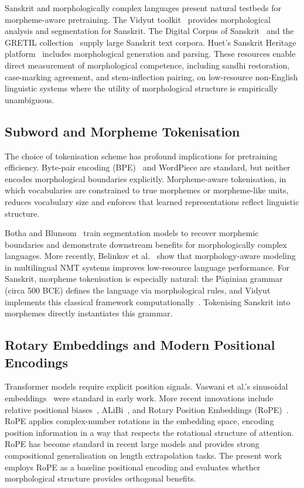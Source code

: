 Sanskrit and morphologically complex languages present natural testbeds for morpheme-aware pretraining. The Vidyut toolkit~\cite{Prasad2024Vidyut} provides morphological analysis and segmentation for Sanskrit. The Digital Corpus of Sanskrit~\cite{Goyal2012DCS} and the GRETIL collection~\cite{Germann1994GRETIL} supply large Sanskrit text corpora. Huet's Sanskrit Heritage platform~\cite{Huet2003SanskritHeritage} includes morphological generation and parsing. These resources enable direct measurement of morphological competence, including sandhi restoration, case-marking agreement, and stem-inflection pairing, on low-resource non-English linguistic systems where the utility of morphological structure is empirically unambiguous.

\subsection{Subword and Morpheme Tokenisation}

The choice of tokenisation scheme has profound implications for pretraining efficiency. Byte-pair encoding (BPE)~\cite{Sennrich2016BPE} and WordPiece are standard, but neither encodes morphological boundaries explicitly. Morpheme-aware tokenisation, in which vocabularies are constrained to true morphemes or morpheme-like units, reduces vocabulary size and enforces that learned representations reflect linguistic structure.

Botha and Blunsom~\cite{Botha2014Morphology} train segmentation models to recover morphemic boundaries and demonstrate downstream benefits for morphologically complex languages. More recently, Belinkov et al.~\cite{Belinkov2017Morphology} show that morphology-aware modeling in multilingual NMT systems improves low-resource language performance. For Sanskrit, morpheme tokenisation is especially natural: the Pāṇinian grammar (circa 500 BCE) defines the language via morphological rules, and Vidyut implements this classical framework computationally~\cite{Prasad2024Vidyut}. Tokenising Sanskrit into morphemes directly instantiates this grammar.

\subsection{Rotary Embeddings and Modern Positional Encodings}

Transformer models require explicit position signals. Vaswani et al.'s sinusoidal embeddings~\cite{Vaswani2017} were standard in early work. More recent innovations include relative positional biases~\cite{Shaw2018Relative}, ALiBi~\cite{Press2022ALiBi}, and Rotary Position Embeddings (RoPE)~\cite{Su2021RoPE}. RoPE applies complex-number rotations in the embedding space, encoding position information in a way that respects the rotational structure of attention. RoPE has become standard in recent large models and provides strong compositional generalisation on length extrapolation tasks. The present work employs RoPE as a baseline positional encoding and evaluates whether morphological structure provides orthogonal benefits.


